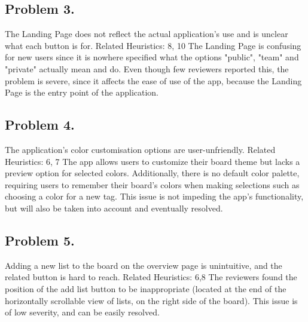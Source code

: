 \subsection*{Problem 3.}
The Landing Page does not reflect the actual application's use and is unclear what each button is for.
\newline
Related Heuristics: 8, 10
\newline
\indent The Landing Page is confusing for new users since it is nowhere specified what the options "public", "team" and "private" actually mean and do. Even though few reviewers reported this, the problem is severe, since it affects the ease of use of the app, because the Landing Page is the entry point of the application.
\newline

\subsection*{Problem 4.}
The application's color customisation options are user-unfriendly.
\newline
Related Heuristics: 6, 7
\newline
\indent
The app allows users to customize their board theme but lacks a preview option for selected colors. Additionally, there is no default color palette, requiring users to remember their board’s colors when making selections such as choosing a color for a new tag.
\newline
\indent This issue is not impeding the app’s functionality, but will also be taken into account and eventually resolved.
\newline

\subsection*{Problem 5.}
Adding a new list to the board on the overview page is unintuitive, and the related button is hard to reach.
\newline
Related Heuristics: 6,8
\newline
\indent The reviewers found the position of the add list button to be inappropriate (located at the end of the horizontally scrollable view of lists, on the right side of the board). 
\newline
\indent This issue is of low severity, and can be easily resolved.
\newline

